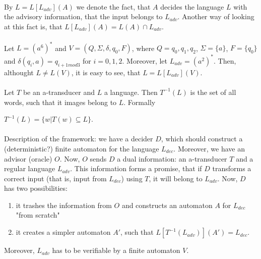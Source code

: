 \documentclass[12pt,oneside,a4paper]{book}
\begin{document}
\paragraph{}
\oznacenie By $L = L[L_{adv}](A)$ we denote the fact, that $A$ decides the language $L$ with the advisory information, that the input belongs to $L_{adv}$. Another way of looking at this fact is, that $L[L_{adv}](A) = L(A) \cap L_{adv}$.

\paragraph{}
\cpriklad Let $L = (a^6)^*$ and $V = (Q, \Sigma, \delta, q_0, F)$, where $Q = {q_0, q_1, q_2}$, $\Sigma = \{ a\} $, $F = \{ q_0\}$ and $\delta (q_i, a) = q_{i+1 mod 3}$ for $i = 0,1,2$. Moreover, let $L_{adv} = (a^2)^*$. Then, althought $L \neq L(V)$, it is easy to see, that $L = L[L_{adv}](V)$.

\paragraph{}
 Let $T$ be an a-transducer and $L$ a language. Then $T^{-1}(L)$ is the set of all words, such that it images belong to $L$. Formally \\
\centerline{$T^{-1}(L) = \{ w | T(w) \subseteq L \}$.}

\paragraph{}
Description of the framework: we have a decider $D$, which should construct a (deterministic?) finite automaton for the language $L_{dec}$. Moreover, we have an advisor (oracle) $O$. Now, $O$ sends $D$ a dual information: an a-transducer $T$ and a regular language $L_{adv}$. This information forms a promise, that if $D$ transforms a correct input (that is, input from $L_{dec}$) using $T$, it will belong to $L_{adv}$. Now, $D$ has two possibilities:

\begin{enumerate}
\item it trashes the information from $O$ and constructs an automaton $A$ for $L_{dec}$ "from scratch"
\item it creates a simpler automaton $A'$, such that $L[T^{-1}(L_{adv})](A') = L_{dec}$.
\end{enumerate}

Moreover, $L_{adv}$ has to be verifiable by a finite automaton $V$.
\end{document}
